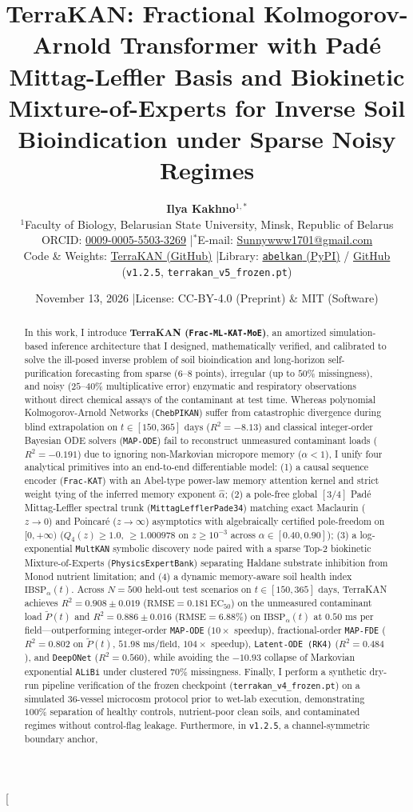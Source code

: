 \documentclass[10pt,twocolumn,a4paper]{article}
\title{\vspace*{-7mm}\textbf{\Large TerraKAN: Fractional Kolmogorov-Arnold Transformer with Pad\'e Mittag-Leffler Basis and Biokinetic Mixture-of-Experts for Inverse Soil Bioindication under Sparse Noisy Regimes}}
\author{
  \textbf{Ilya Kakhno}$^{1,*}$ \\
  \small $^{1}$Faculty of Biology, Belarusian State University, Minsk, Republic of Belarus \\
  \small ORCID: \href{https://orcid.org/0009-0005-5503-3269}{0009-0005-5503-3269} \quad|\quad $^{*}$E-mail: \href{mailto:Sunnywww1701@gmail.com}{Sunnywww1701@gmail.com} \\
  \small Code \& Weights: \href{https://github.com/Lolycut/TerraKAN}{TerraKAN (GitHub)} \quad|\quad Library: \href{https://pypi.org/project/abelkan/}{\texttt{abelkan} (PyPI)} / \href{https://github.com/Lolycut/abelkan}{GitHub}  \quad (\texttt{v1.2.5}, \texttt{terrakan\_v5\_frozen.pt})
}
\date{\small November 13, 2026 \quad|\quad License: CC-BY-4.0 (Preprint) \& MIT (Software)}
\begin{document}
\twocolumn[
  \begin{@twocolumnfalse}
    \maketitle
    \vspace*{-4mm}
    \begin{abstract}
      \noindent
      In this work, I introduce \textbf{TerraKAN (\texttt{Frac-ML-KAT-MoE})}, an amortized simulation-based inference architecture that I designed, mathematically verified, and calibrated to solve the ill-posed inverse problem of soil bioindication and long-horizon self-purification forecasting from sparse ($6\text{--}8$ points), irregular (up to $50\%$ missingness), and noisy ($25\text{--}40\%$ multiplicative error) enzymatic and respiratory observations without direct chemical assays of the contaminant at test time. Whereas polynomial Kolmogorov-Arnold Networks (\texttt{ChebPIKAN}) suffer from catastrophic divergence during blind extrapolation on $t \in {[150, 365]}\text{ days}$ ($R^2 = -8.13$) and classical integer-order Bayesian ODE solvers (\texttt{MAP-ODE}) fail to reconstruct unmeasured contaminant loads ($R^2 = -0.191$) due to ignoring non-Markovian micropore memory ($\alpha < 1$), I unify four analytical primitives into an end-to-end differentiable model: (1) a causal sequence encoder (\texttt{Frac-KAT}) with an Abel-type power-law memory attention kernel and strict weight tying of the inferred memory exponent $\hat{\alpha}$; (2) a pole-free global ${[3/4]}$ Pad\'e Mittag-Leffler spectral trunk (\texttt{MittagLefflerPade34}) matching exact Maclaurin ($z \to 0$) and Poincar\'e ($z \to \infty$) asymptotics with algebraically certified pole-freedom on $[0, +\infty)$ ($Q_4(z) \ge 1.0$, $\ge 1.000978$ on $z \ge 10^{-3}$ across $\alpha \in {[0.40, 0.90]}$); (3) a log-exponential \texttt{MultKAN} symbolic discovery node paired with a sparse Top-2 biokinetic Mixture-of-Experts (\texttt{PhysicsExpertBank}) separating Haldane substrate inhibition from Monod nutrient limitation; and (4) a dynamic memory-aware soil health index $\text{IBSP}_\alpha(t)$. Across $N=500$ held-out test scenarios on $t \in {[150, 365]}\text{ days}$, TerraKAN achieves $R^2 = 0.908 \pm 0.019$ ($\text{RMSE} = 0.181\,\text{EC}_{50}$) on the unmeasured contaminant load $\tilde{P}(t)$ and $R^2 = 0.886 \pm 0.016$ ($\text{RMSE} = 6.88\%$) on $\text{IBSP}_\alpha(t)$ at $0.50\text{ ms}$ per field---outperforming integer-order \texttt{MAP-ODE} ($10\times$ speedup), fractional-order \texttt{MAP-FDE} ($R^2 = 0.802$ on $\tilde{P}(t)$, $51.98\text{ ms/field}$, $104\times$ speedup), \texttt{Latent-ODE (RK4)} ($R^2 = 0.484$), and \texttt{DeepONet} ($R^2 = 0.560$), while avoiding the $-10.93$ collapse of Markovian exponential \texttt{ALiBi} under clustered $70\%$ missingness. Finally, I perform a synthetic dry-run pipeline verification of the frozen checkpoint (\texttt{terrakan\_v4\_frozen.pt}) on a simulated 36-vessel microcosm protocol prior to wet-lab execution, demonstrating $100\%$ separation of healthy controls, nutrient-poor clean soils, and contaminated regimes without control-flag leakage. Furthermore, in \texttt{v1.2.5}, a channel-symmetric boundary anchor, 
\end{abstract}
\end{@twocolumnfalse}
\end{document}
